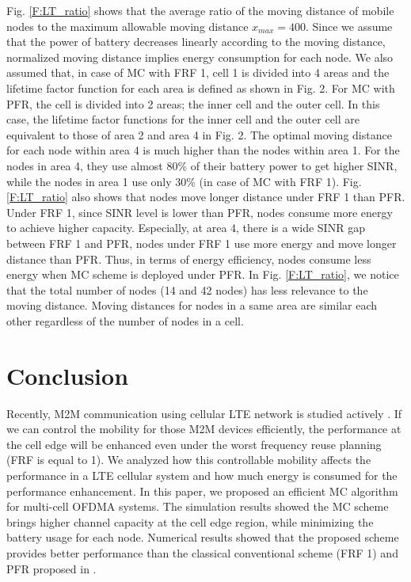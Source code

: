 \documentclass[conference]{IEEEtran}
\begin{document}
Fig. \ref{F:LT_ratio} shows that the average ratio of the moving distance of mobile nodes to the maximum allowable moving distance $x_{max} = 400$. Since we assume that the power of battery decreases linearly according to the moving distance, normalized moving distance implies energy consumption for each node. We also assumed that, in case of MC with FRF 1, cell 1 is divided into 4 areas and the lifetime factor function for each area is defined as shown in Fig. 2. For MC with PFR, the cell is divided into 2 areas; the inner cell and the outer cell. In this case, the lifetime factor functions for the inner cell and the outer cell are equivalent to those of area 2 and area 4 in Fig. 2. The optimal moving distance for each node within area 4 is much higher than the nodes within area 1. For the nodes in area 4, they use almost 80\% of their battery power to get higher SINR, while the nodes in area 1 use only 30\% (in case of MC with FRF 1). Fig. \ref{F:LT_ratio} also shows that nodes move longer distance under FRF 1 than PFR. Under FRF 1, since SINR level is lower than PFR, nodes consume more energy to achieve higher capacity. Especially, at area 4, there is a wide SINR gap between FRF 1 and PFR, nodes under FRF 1 use more energy and move longer distance than PFR. Thus, in terms of energy efficiency, nodes consume less energy when MC scheme is deployed under PFR. In Fig. \ref{F:LT_ratio}, we notice that the total number of nodes (14 and 42 nodes) has less relevance to the moving distance. Moving distances for nodes in a same area are similar each other regardless of the number of nodes in a cell.



\section{Conclusion}

Recently, M2M communication using cellular LTE network is studied actively \cite{3GPP_b}. If we can control the mobility for those M2M devices efficiently, the performance at the cell edge will be enhanced even under the worst frequency reuse planning (FRF is equal to 1). We analyzed how this controllable mobility affects the performance in a LTE cellular system and how much energy is consumed for the performance enhancement. In this paper, we proposed an efficient MC algorithm for multi-cell OFDMA systems. The simulation results showed the MC scheme brings higher channel capacity at the cell edge region, while minimizing the battery usage for each node. Numerical results showed that the proposed scheme provides better performance than the classical conventional scheme (FRF 1) and PFR proposed in \cite{Najjar}.
\end{document}
